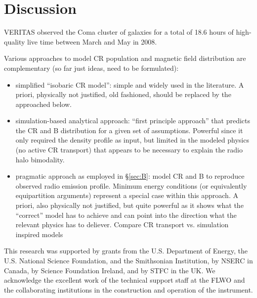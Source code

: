 \documentclass[12pt,manuscript]{aastex}
\begin{document}
\section{Discussion}
VERITAS observed the Coma cluster of galaxies for a total of 18.6 hours of high-quality live time between March and May in 2008. 

Various approaches to model CR population and magnetic field distribution are complementary (so far just ideas, need to be formulated):
\begin{itemize}
\item simplified ``isobaric CR model'': simple and widely used in the literature. A priori, physically not justified, old fashioned, should be replaced by the approached below.
\item simulation-based analytical approach: ``first principle approach'' that predicts the CR and B distribution for a given set of assumptions. Powerful since it only required the density profile as input, but limited in the modeled physics (no active CR transport) that appears to be necessary to explain the radio halo bimodality.
\item pragmatic approach as employed in \S \ref{sec:B}: model CR and B to reproduce observed radio emission profile. Minimum energy conditions (or equivalently equipartition arguments) represent a special case within this approach. A priori, also physically not justified, but quite powerful as it shows what the ``correct'' model has to achieve and can point into the direction what the relevant physics has to deliever. Compare CR transport vs. simulation inspired models
\end{itemize}

\acknowledgments
This research was supported by grants from the U.S. Department of Energy, the U.S. National Science Foundation, and the Smithsonian Institution, by NSERC in Canada, by Science Foundation Ireland, and by STFC in the UK. We acknowledge the excellent work of the technical support staff at the FLWO and the collaborating institutions in the construction and operation of the instrument.




\end{document}
